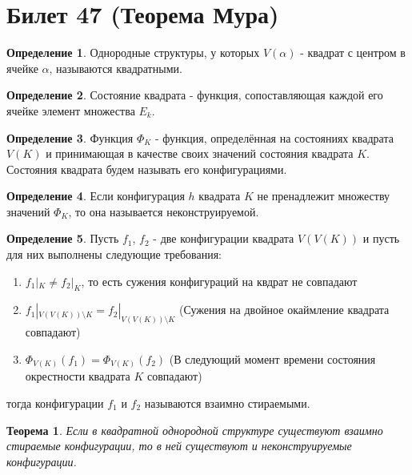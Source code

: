 \documentclass[a4paper, 12pt]{article}
\theoremstyle{definition}
\newtheorem*{definition}{Определение}
\theoremstyle{plain}
\newtheorem*{theorem}{Теорема}
\theoremstyle{remark}
\begin{document}
  \section{Билет 47 (Теорема Мура)}
  \begin{definition}
    Однородные структуры, у которых $V(\alpha)$ - квадрат с центром в ячейке $\alpha$, называются квадратными.
  \end{definition}
  \begin{definition}
    Состояние квадрата - функция, сопоставляющая каждой его ячейке элемент множества $E_k$.
  \end{definition}
  \begin{definition}
    Функция $\Phi_K$ - функция, определённая на состояниях квадрата $V(K)$ и принимающая в качестве своих значений состояния квадрата $K$. Состояния квадрата будем называть его конфигурациями.
  \end{definition}
  \begin{definition}
    Если конфигурация $h$ квадрата $K$ не пренадлежит множеству значений $\Phi_K$, то она называется неконструируемой.
  \end{definition}
  \begin{definition}
    Пусть $f_1$, $f_2$ - две конфигурации квадрата $V(V(K))$ и пусть для них выполнены следующие требования:\\
    \begin{enumerate}
      \item $f_1|_K\neq f_2|_K$, то есть сужения конфигураций на квдрат не совпадают
      \item $f_1|_{V(V(K))\setminus K}=f_2|_{V(V(K))\setminus K}$ (Сужения на двойное окаймление квадрата совпадают)
      \item $\Phi_{V(K)}(f_1)=\Phi_{V(K)}(f_2)$ (В следующий момент времени состояния окрестности квадрата $K$ совпадают)
    \end{enumerate}
    тогда конфигурации $f_1$ и $f_2$ называются взаимно стираемыми.
  \end{definition}
  \begin{theorem}
    Если в квадратной однородной структуре существуют взаимно стираемые конфигурации, то в ней существуют и неконструируемые конфигурации.
  \end{theorem}
\end{document}
